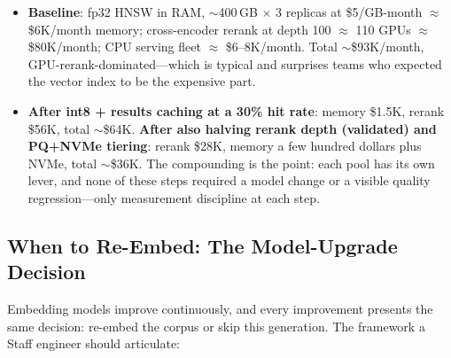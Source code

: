 \begin{itemize}
    \item \textbf{Baseline}: fp32 HNSW in RAM, $\sim$400\,GB $\times$ 3 replicas at \$5/GB-month $\approx$ \$6K/month memory; cross-encoder rerank at depth 100 $\approx$ 110 GPUs $\approx$ \$80K/month; CPU serving fleet $\approx$ \$6--8K/month. Total $\sim$\$93K/month, GPU-rerank-dominated---which is typical and surprises teams who expected the vector index to be the expensive part.
    \item \textbf{After int8 + results caching at a 30\% hit rate}: memory \$1.5K, rerank \$56K, total $\sim$\$64K. \textbf{After also halving rerank depth (validated) and PQ+NVMe tiering}: rerank \$28K, memory a few hundred dollars plus NVMe, total $\sim$\$36K. The compounding is the point: each pool has its own lever, and none of these steps required a model change or a visible quality regression---only measurement discipline at each step.
\end{itemize}

\subsection{When to Re-Embed: The Model-Upgrade Decision}

Embedding models improve continuously, and every improvement presents the same decision: re-embed the corpus or skip this generation. The framework a Staff engineer should articulate:

